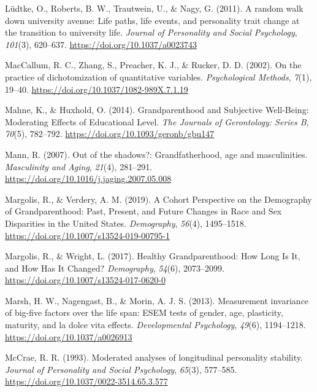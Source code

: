 \documentclass[
  english,
  man, noextraspace]{apa7}
\begin{document}
\leavevmode\hypertarget{ref-ludtkeRandomWalkUniversity2011}{}%
Lüdtke, O., Roberts, B. W., Trautwein, U., \& Nagy, G. (2011). A random walk down university avenue: Life paths, life events, and personality trait change at the transition to university life. \emph{Journal of Personality and Social Psychology}, \emph{101}(3), 620--637. \url{https://doi.org/10.1037/a0023743}

\leavevmode\hypertarget{ref-maccallumPracticeDichotomizationQuantitative2002}{}%
MacCallum, R. C., Zhang, S., Preacher, K. J., \& Rucker, D. D. (2002). On the practice of dichotomization of quantitative variables. \emph{Psychological Methods}, \emph{7}(1), 19--40. \url{https://doi.org/10.1037/1082-989X.7.1.19}

\leavevmode\hypertarget{ref-mahneGrandparenthoodSubjectiveWellBeing2014}{}%
Mahne, K., \& Huxhold, O. (2014). Grandparenthood and Subjective Well-Being: Moderating Effects of Educational Level. \emph{The Journals of Gerontology: Series B}, \emph{70}(5), 782--792. \url{https://doi.org/10.1093/geronb/gbu147}

\leavevmode\hypertarget{ref-mannOutShadowsGrandfatherhood2007}{}%
Mann, R. (2007). Out of the shadows?: Grandfatherhood, age and masculinities. \emph{Masculinity and Aging}, \emph{21}(4), 281--291. \url{https://doi.org/10.1016/j.jaging.2007.05.008}

\leavevmode\hypertarget{ref-margolisCohortPerspectiveDemography2019}{}%
Margolis, R., \& Verdery, A. M. (2019). A Cohort Perspective on the Demography of Grandparenthood: Past, Present, and Future Changes in Race and Sex Disparities in the United States. \emph{Demography}, \emph{56}(4), 1495--1518. \url{https://doi.org/10.1007/s13524-019-00795-1}

\leavevmode\hypertarget{ref-margolisHealthyGrandparenthoodHow2017}{}%
Margolis, R., \& Wright, L. (2017). Healthy Grandparenthood: How Long Is It, and How Has It Changed? \emph{Demography}, \emph{54}(6), 2073--2099. \url{https://doi.org/10.1007/s13524-017-0620-0}

\leavevmode\hypertarget{ref-marshMeasurementInvarianceBigfive2013}{}%
Marsh, H. W., Nagengast, B., \& Morin, A. J. S. (2013). Measurement invariance of big-five factors over the life span: ESEM tests of gender, age, plasticity, maturity, and la dolce vita effects. \emph{Developmental Psychology}, \emph{49}(6), 1194--1218. \url{https://doi.org/10.1037/a0026913}

\leavevmode\hypertarget{ref-mccraeModeratedAnalysesLongitudinal1993}{}%
McCrae, R. R. (1993). Moderated analyses of longitudinal personality stability. \emph{Journal of Personality and Social Psychology}, \emph{65}(3), 577--585. \url{https://doi.org/10.1037/0022-3514.65.3.577}
\end{document}
